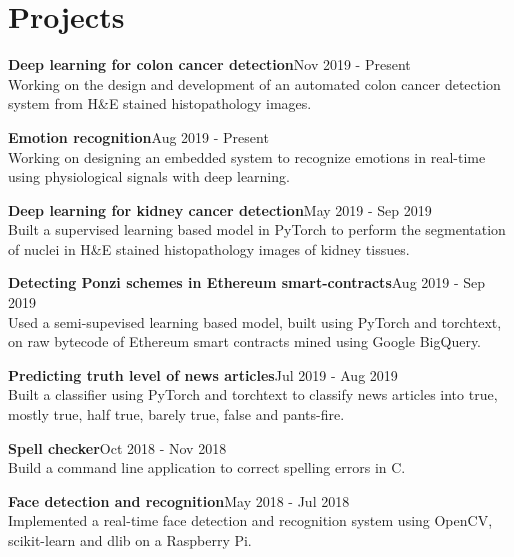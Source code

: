 \documentclass[letterpaper]{article}
\renewenvironment{itemize}{
  \begin{list}{}{
    \setlength{\leftmargin}{1.5em}
  }
}{
  \end{list}
}
\begin{document}
\section*{Projects}
  \begin{itemize}
    \item
    \textbf{Deep learning for colon cancer detection}\hfill{Nov 2019 - Present}\\
    Working on the design and development of an automated colon cancer detection system from H\&E stained histopathology images.

    \item
    \textbf{Emotion recognition}\hfill{Aug 2019 - Present}\\
    Working on designing an embedded system to recognize emotions in real-time using physiological signals with deep learning.

    \item
    \textbf{Deep learning for kidney cancer detection}\hfill{May 2019 - Sep 2019}\\
    Built a supervised learning based model in PyTorch to perform the segmentation of nuclei in H\&E stained histopathology images of kidney tissues.

    \item
    \textbf{Detecting Ponzi schemes in Ethereum smart-contracts}\hfill{Aug 2019 - Sep 2019}\\
    Used a semi-supevised learning based model, built using PyTorch and torchtext, on raw bytecode of Ethereum smart contracts mined using Google BigQuery.

    \item
    \textbf{Predicting truth level of news articles}\hfill{Jul 2019 - Aug 2019}\\
    Built a classifier using PyTorch and torchtext to classify news articles into true, mostly true, half true, barely true, false and pants-fire.

    \item
    \textbf{Spell checker}\hfill{Oct 2018 - Nov 2018}\\
    Build a command line application to correct spelling errors in C.

    \item
    \textbf{Face detection and recognition}\hfill{May 2018 - Jul 2018}\\
    Implemented a real-time face detection and recognition system using OpenCV, scikit-learn and dlib on a Raspberry Pi.

  \end{itemize}
\end{document}
